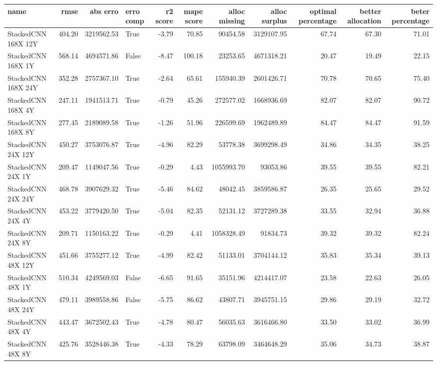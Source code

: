 \begin{tabular}{lrrlrrrrrrr}
\toprule
name & rmse & abs erro & erro comp & r2 score & mape score & alloc missing & alloc surplus & optimal percentage & better allocation & beter percentage \\
\midrule
StackedCNN 168X 12Y & 404.20 & 3219562.53 & True & -3.79 & 70.85 & 90454.58 & 3129107.95 & 67.74 & 67.30 & 71.01 \\
StackedCNN 168X 1Y & 568.14 & 4694571.86 & False & -8.47 & 100.18 & 23253.65 & 4671318.21 & 20.47 & 19.49 & 22.15 \\
StackedCNN 168X 24Y & 352.28 & 2757367.10 & True & -2.64 & 65.61 & 155940.39 & 2601426.71 & 70.78 & 70.65 & 75.40 \\
StackedCNN 168X 4Y & 247.11 & 1941513.71 & True & -0.79 & 45.26 & 272577.02 & 1668936.69 & 82.07 & 82.07 & 90.72 \\
StackedCNN 168X 8Y & 277.45 & 2189089.58 & True & -1.26 & 51.96 & 226599.69 & 1962489.89 & 84.47 & 84.47 & 91.59 \\
StackedCNN 24X 12Y & 450.27 & 3753076.87 & True & -4.96 & 82.29 & 53778.38 & 3699298.49 & 34.86 & 34.35 & 38.25 \\
StackedCNN 24X 1Y & 209.47 & 1149047.56 & True & -0.29 & 4.43 & 1055993.70 & 93053.86 & 39.55 & 39.55 & 82.21 \\
StackedCNN 24X 24Y & 468.78 & 3907629.32 & True & -5.46 & 84.62 & 48042.45 & 3859586.87 & 26.35 & 25.65 & 29.52 \\
StackedCNN 24X 4Y & 453.22 & 3779420.50 & True & -5.04 & 82.35 & 52131.12 & 3727289.38 & 33.55 & 32.94 & 36.88 \\
StackedCNN 24X 8Y & 209.71 & 1150163.22 & True & -0.29 & 4.41 & 1058328.49 & 91834.73 & 39.32 & 39.32 & 82.24 \\
StackedCNN 48X 12Y & 451.66 & 3755277.12 & True & -4.99 & 82.42 & 51133.01 & 3704144.12 & 35.83 & 35.34 & 39.13 \\
StackedCNN 48X 1Y & 510.34 & 4249569.03 & False & -6.65 & 91.65 & 35151.96 & 4214417.07 & 23.58 & 22.63 & 26.05 \\
StackedCNN 48X 24Y & 479.11 & 3989558.86 & False & -5.75 & 86.62 & 43807.71 & 3945751.15 & 29.86 & 29.19 & 32.72 \\
StackedCNN 48X 4Y & 443.47 & 3672502.43 & True & -4.78 & 80.47 & 56035.63 & 3616466.80 & 33.50 & 33.02 & 36.99 \\
StackedCNN 48X 8Y & 425.76 & 3528446.38 & True & -4.33 & 78.29 & 63798.09 & 3464648.29 & 35.06 & 34.73 & 38.87 \\

\end{tabular}
